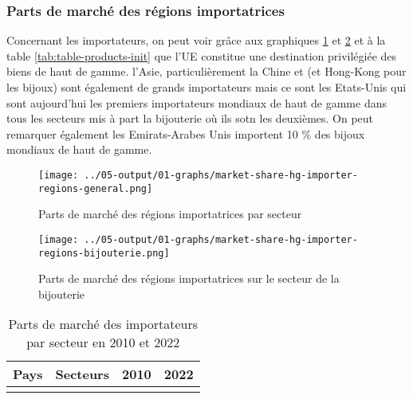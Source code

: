 \documentclass[french,10pt,a4paper]{article}
\begin{document}
\subsubsection{Parts de marché des régions importatrices}

Concernant les importateurs, on peut voir grâce aux graphiques \ref{fig:market-share-hg-importer-regions-general} et \ref{fig:market-share-hg-importer-regions-bijouterie} et à la table \ref{tab:table-products-init} que l'UE constitue une destination privilégiée des biens de haut de gamme. l'Asie, particulièrement la Chine et (et Hong-Kong pour les bijoux) sont également de grands importateurs mais ce sont les Etats-Unis qui sont aujourd'hui les premiers importateurs mondiaux de haut de gamme dans tous les secteurs mis à part la bijouterie où ils sotn les deuxièmes. On peut remarquer également les Emirats-Arabes Unis importent 10 \% des bijoux mondiaux de haut de gamme. 

\begin{figure}[!h]
  \centering \texttt{[image: ../05-output/01-graphs/market-share-hg-importer-regions-general.png]}
  \caption{Parts de marché des régions importatrices par secteur}
  \label{fig:market-share-hg-importer-regions-general}
\end{figure}

\begin{figure}[!h]
  \centering \texttt{[image: ../05-output/01-graphs/market-share-hg-importer-regions-bijouterie.png]}
  \caption{Parts de marché des régions importatrices sur le secteur de la bijouterie}
  \label{fig:market-share-hg-importer-regions-bijouterie}
\end{figure}

\begin{table}[ht]
  \centering
  \begin{tabular}{lrrr}
    \hline
   Pays & Secteurs & 2010 & 2022 \\
    \hline
    \\
    \hline
  \end{tabular}
  \caption{Parts de marché des importateurs par secteur en 2010 et 2022}
  \label{tab:market-share-country-importer}
\end{table}
\end{document}
